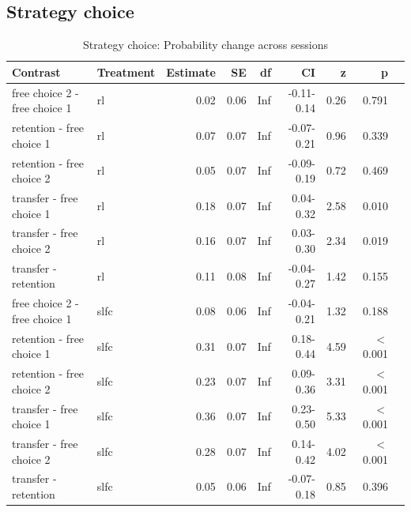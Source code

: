 \documentclass[pdflatex,sn-nature]{sn-jnl}%
\theoremstyle{thmstyleone}%
\theoremstyle{thmstyletwo}%
\theoremstyle{thmstylethree}%
\begin{document}
\begin{appendices}
\subsection{Strategy choice}


\begin{table}[p]
\caption{Strategy choice: Probability change across sessions}\label{strategychoice_theorybest_change}
\begin{tabular}{llrrrrrrr}
  \hline
 Contrast & Treatment & Estimate & SE & df & CI & z & p \\ 
  \hline
  free choice 2 - free choice 1 & rl & 0.02 & 0.06 & Inf & -0.11-0.14 & 0.26 &   0.791 \\ 
  retention - free choice 1 & rl & 0.07 & 0.07 & Inf & -0.07-0.21 & 0.96 &   0.339 \\ 
  retention - free choice 2 & rl & 0.05 & 0.07 & Inf & -0.09-0.19 & 0.72 &    0.469 \\ 
  transfer - free choice 1 & rl & 0.18 & 0.07 & Inf & 0.04-0.32 & 2.58 &    0.010 \\ 
  transfer - free choice 2 & rl & 0.16 & 0.07 & Inf & 0.03-0.30 & 2.34 &    0.019 \\ 
  transfer - retention & rl & 0.11 & 0.08 & Inf & -0.04-0.27 & 1.42 &    0.155 \\ 
  free choice 2 - free choice 1 & slfc & 0.08 & 0.06 & Inf & -0.04-0.21 & 1.32 &    0.188 \\ 
  retention - free choice 1 & slfc & 0.31 & 0.07 & Inf & 0.18-0.44 & 4.59 &  $<$  0.001 \\ 
  retention - free choice 2 & slfc & 0.23 & 0.07 & Inf & 0.09-0.36 & 3.31 &  $<$  0.001 \\ 
  transfer - free choice 1 & slfc & 0.36 & 0.07 & Inf & 0.23-0.50 & 5.33 &  $<$  0.001 \\ 
  transfer - free choice 2 & slfc & 0.28 & 0.07 & Inf & 0.14-0.42 & 4.02 &  $<$  0.001 \\ 
  transfer - retention & slfc & 0.05 & 0.06 & Inf & -0.07-0.18 & 0.85 &    0.396 \\ 
   \hline
\end{tabular}
\end{table}


\end{appendices}
\end{document}
